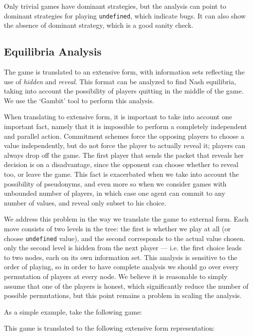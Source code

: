 \documentclass[acmsmall,review,anonymous]{acmart}\settopmatter{printfolios=true,printccs=false,printacmref=false}
\begin{document}
Only trivial games have dominant strategies, but the analysis can point to dominant strategies for playing \texttt{undefined}, which indicate bugs. It can also show the absence of dominant strategy, which is a good sanity check.

\subsection{Equilibria Analysis}
The game is translated to an extensive form, with information sets reflecting the use of \emph{hidden} and \emph{reveal}.
This format can be analyzed to find Nash equilibria, taking into account the possibility of players quitting in the middle of the game. We use the `Gambit' tool to perform this analysis.

When translating to extensive form, it is important to take into account one important fact, namely that it is impossible to perform a completely independent and parallel action. Commitment schemes force the opposing players to choose a value independently, but do not force the player to actually reveal it; players can always drop off the game. The first player that sends the packet that reveals her decision is on a disadvantage, since the opponent can choose whether to reveal too, or leave the game. This fact is exacerbated when we take into account the possibility of pseudonyms, and even more so when we consider games with unbounded number of players, in which case one agent can commit to any number of values, and reveal only subset to his choice.

We address this problem in the way we translate the game to external form. Each move consists of two levels in the tree: the first is whether we play at all (or choose \texttt{undefined} value), and the second corresponds to the actual value chosen. only the second level is hidden from the next player --- i.e. the first choice leads to two nodes, each on its own information set. This analysis is sensitive to the order of playing, so in order to have complete analysis we should go over every permutation of players at every node. We believe it is reasonable to simply assume that one of the players is honest, which significantly reduce the number of possible permutations, but this point remains a problem in scaling the analysis.

As a simple example, take the following game:


This game is translated to the following extensive form representation:
\end{document}
